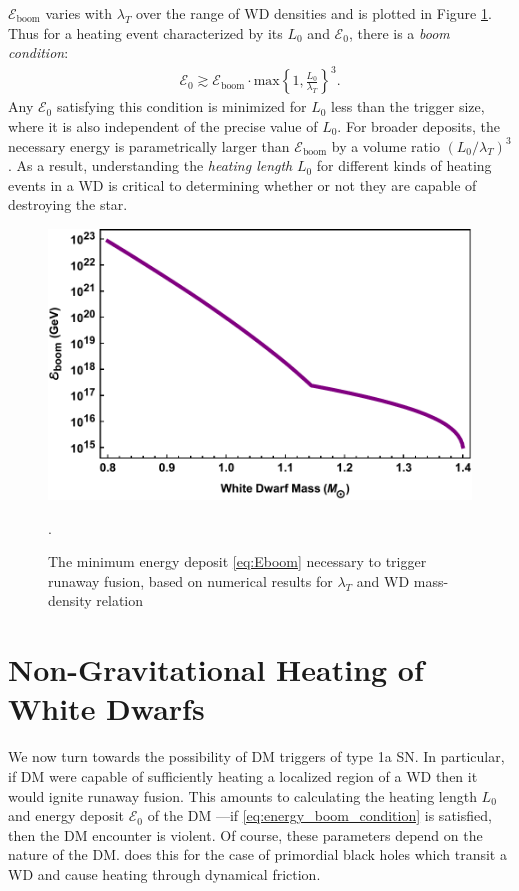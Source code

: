 \documentclass[preprintnumbers,amsmath,amssymb,prd, superscriptaddress,twocolumn]{revtex4}
\newcommand{\Ez}{\mathcal{E}_0}
\newcommand{\Eboom}{\mathcal{E}_\text{boom}}
\begin{document}
$\Eboom$ varies with $\lambda_T$ over the range of WD densities and is plotted in Figure \ref{fig:Eboom}. 
Thus for a heating event characterized by its $L_0$ and $\Ez$, there is a \emph{boom condition}:
\begin{align}
    \label{eq:energy_boom_condition}
    \Ez \gtrsim
    \Eboom \cdot \text{max}\left\{1, \frac{L_0}{\lambda_T}\right\}^3.
\end{align}
Any $\Ez$ satisfying this condition is minimized for $L_0$ less than the trigger size, where it is also independent of the precise value of $L_0$.
For broader deposits, the necessary energy is parametrically larger than $\Eboom$ by a volume ratio $(L_0/\lambda_T)^3$.
As a result, understanding the \emph{heating length} $L_0$ for different kinds of heating events in a WD is critical to determining whether or not they are capable of destroying the star.
\begin{figure}
\includegraphics[scale=.45]{Eboom.pdf}
\caption{The minimum energy deposit \eqref{eq:Eboom} necessary to trigger runaway fusion, based on numerical results for $\lambda_T$ \cite{Woosley} and WD mass-density relation \cite{cococubed}}.
\label{fig:Eboom}
\end{figure}

\section{Non-Gravitational Heating of White Dwarfs}
\label{sec:SMHeating}

We now turn towards the possibility of DM triggers of type 1a SN. 
In particular, if DM were capable of sufficiently heating a localized region of a WD then it would ignite runaway fusion.
This amounts to calculating the heating length $L_0$ and energy deposit $\Ez$ of the DM ---if \eqref{eq:energy_boom_condition} is satisfied, then the DM encounter is violent. 
Of course, these parameters depend on the nature of the DM.
\cite{Graham:2015apa} does this for the case of primordial black holes which transit a WD and cause heating through dynamical friction.
\end{document}
